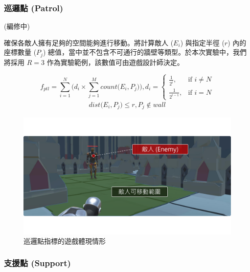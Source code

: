 \subsubsection{巡邏點 (Patrol)}
\label{sssec:method-segments-fitnesses-patrol}

(編修中)

確保各敵人擁有足夠的空間能夠進行移動。將計算敵人 ($E_{i}$) 與指定半徑 ($r$) 內的座標數量 ($P_j$) 總值，當中並不包含不可通行的牆壁等類型。於本次實驗中，我們將採用 $R=3$ 作為實驗範例，該數值可由遊戲設計師決定。

\begin{equation}
    f_{ptl} = \sum_{i=1}^{N} \Big( d_{i} \times \sum_{j=1}^{M} count\big(E_{i}, P_{j}\big) \Big), 
    d_{i} = \begin{cases}
                \frac{1}{2^{i}},   & \mbox{if } i \neq N \\
                \frac{1}{2^{i-1}}, & \mbox{if } i = N
            \end{cases}
\end{equation}
\begin{gather*}
    dist\big(E_{i}, P_{j}\big) \leq r,  P_{j} \notin wall
\end{gather*}

\begin{figure}[ht]
  \begin{center}
    \includegraphics[width=1.0\textwidth]{figures/fitnesses-patrol-gameplay.pdf}
    \caption{巡邏點指標的遊戲體現情形}
    \label{fig:fitnesses-patrol-gameplay}
  \end{center}
\end{figure}

\subsubsection{支援點 (Support)}
\label{sssec:method-segments-fitnesses-support}

